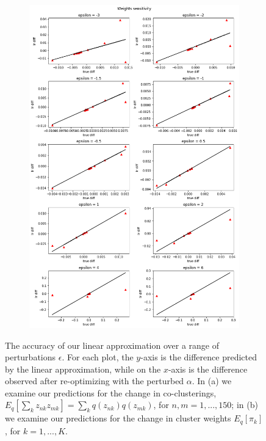 \documentclass[a4paper]{article}
\begin{document}
\begin{figure}[h!]
\begin{subfigure}[t]{0.45\textwidth}
	\end{subfigure}
	\quad
	\begin{subfigure}[t]{0.45\textwidth}
		\includegraphics[width = \textwidth]{./parametric_sensitivity_figs/weight_sensitivity.png}
	\end{subfigure}
	\caption{The accuracy of our linear approximation over a range of perturbations $\epsilon$.
  For each plot, the $y$-axis is the difference predicted by the linear approximation,
  while on the $x$-axis is the difference observed after re-optimizing with the perturbed $\alpha$.
  In (a) we examine our predictions for the change in co-clusterings, $E_q[\sum_k z_{nk}z_{mk}] = \sum_{k} q(z_{nk})q(z_{mk})$,
	for $n, m = 1, ..., 150$; in (b) we examine our
	predictions for the change in cluster weights $E_{q}[\pi_k]$, for $k = 1, ..., K$.  }
	\label{fig:vary_alpha_cocluster_weights}
\end{figure}
\end{document}

